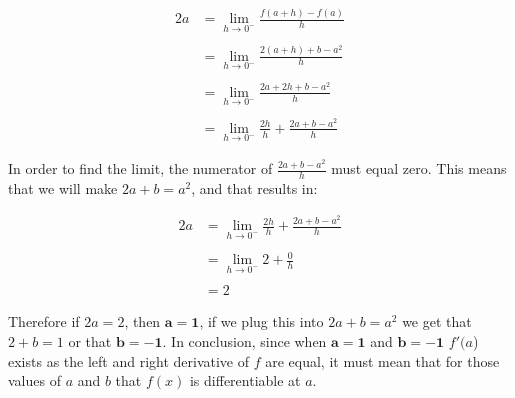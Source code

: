 \documentclass[12pt]{article}
\begin{document}
\begin{align*}
2a & = \lim_{h \to 0^-} \frac{f(a + h)-f(a)}{h}\\\\
& = \lim_{h \to 0^-} \frac{2(a+h)+b-a^2}{h}\\\\
& = \lim_{h \to 0^-} \frac{2a+2h+b-a^2}{h}\\\\
& = \lim_{h \to 0^-} \frac {2h}{h} +\frac{2a+b-a^2}{h}
\end{align*}

In order to find the limit, the numerator of $\frac{2a+b-a^2}{h}$  must equal zero. This means that we will make $2a+b = a^2$, and that results in:

\begin{align*}
2a & = \lim_{h \to 0^-} \frac {2h}{h} +\frac{2a+b-a^2}{h}\\\\\
& = \lim_{h \to 0^-} 2 +\frac{0}{h} \\\\\
& = 2
\end{align*}

Therefore if $2a = 2$, then $\pmb{a=1}$, if we plug this into $2a+b = a^2$ we get that $2 + b = 1$ or that $\pmb{b=-1}$. In conclusion, since when $\pmb{a=1}$ and $\pmb{b=-1}$ $f'(a$) exists as the left and right derivative of $f$ are equal, it must mean that for those values of $a$ and $b$ that $f(x)$ is differentiable at $a$.
\end{document}
